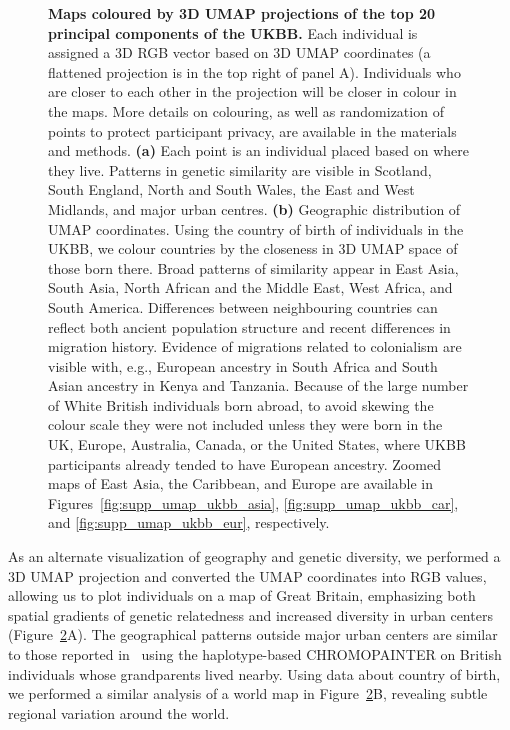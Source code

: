 \begin{figure}[h!]
\begin{subfigure}[b]{0.4\linewidth}
    \caption{}
  \label{fig:umap_world_map}
  \end{subfigure}
  \caption[Maps coloured by 3D UMAP projections]{\textbf{Maps coloured by 3D UMAP projections of the top 20 principal components of the UKBB.} Each individual is assigned a 3D RGB vector based on 3D UMAP coordinates (a flattened projection is in the top right of panel A). Individuals who are closer to each other in the projection will be closer in colour in the maps. More details on colouring, as well as randomization of points to protect participant privacy, are available in the materials and methods. \textbf{(a)} Each point is an individual placed based on where they live. Patterns in genetic similarity are visible in Scotland, South England, North and South Wales, the East and West Midlands, and major urban centres. \textbf{(b)} Geographic distribution of UMAP coordinates. Using the country of birth of individuals in the UKBB, we colour countries by the closeness in 3D UMAP space of those born there. Broad patterns of similarity appear in East Asia, South Asia, North African and the Middle East, West Africa, and South America. Differences between neighbouring countries can reflect both ancient population structure and recent differences in migration history. Evidence of migrations related to colonialism are visible with, e.g., European ancestry in South Africa and South Asian ancestry in Kenya and Tanzania. Because of the large number of White British individuals born abroad, to avoid skewing the colour scale they were not included unless they were born in the UK, Europe, Australia, Canada, or the United States, where UKBB participants already tended to have European ancestry. Zoomed maps of East Asia, the Caribbean, and Europe are available in Figures~\ref{fig:supp_umap_ukbb_asia}, \ref{fig:supp_umap_ukbb_car}, and \ref{fig:supp_umap_ukbb_eur}, respectively.}
  \label{fig:fig5}
\end{figure}

\clearpage

As an alternate visualization of geography and genetic diversity, we performed a 3D UMAP projection and converted the UMAP coordinates into RGB values, allowing us to plot individuals on a map of Great Britain, emphasizing both spatial gradients of genetic relatedness and increased diversity in urban centers (Figure~\ref{fig:fig5}A). The geographical patterns outside major urban centers are similar to those reported in~\citep{leslie2015fine} using the haplotype-based CHROMOPAINTER on British individuals whose grandparents lived nearby. Using data about country of birth, we performed a similar analysis of a world map in Figure~\ref{fig:fig5}B, revealing subtle regional variation around the world. 

